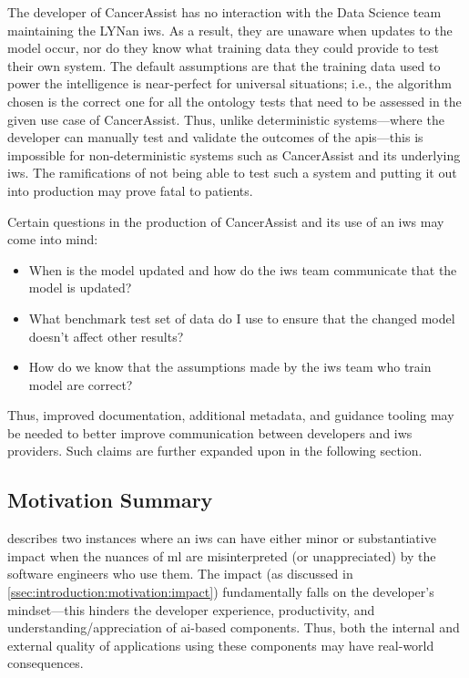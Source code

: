 The developer of CancerAssist has no interaction with the Data Science team maintaining the LYNan \gls{iws}. As a result, they are unaware when updates to the model occur, nor do they know what training data they could provide to test their own system. The default assumptions are that the training data used to power the intelligence is near-perfect for universal situations; i.e., the algorithm chosen is the correct one for all the ontology tests that need to be assessed in the given use case of CancerAssist. Thus, unlike deterministic systems---where the developer can manually test and validate the outcomes of the \glspl{api}---this is impossible for non-deterministic systems such as CancerAssist and its underlying \gls{iws}. The ramifications of not being able to test such a system and putting it out into production may prove fatal to patients.

Certain questions in the production of CancerAssist and its use of an \gls{iws} may come into mind:

\begin{itemize}
  \item When is the model updated and how do the \gls{iws} team communicate that the model is updated?
  \item What benchmark test set of data do I use to ensure that the changed model doesn't affect other results?
  \item How do we know that the assumptions made by the \gls{iws} team who train model are correct?
\end{itemize}

Thus, improved documentation, additional metadata, and guidance tooling may be needed to better improve communication between developers and \gls{iws} providers. Such claims are further expanded upon in the following section.

\subsection{Motivation Summary}

 describes two instances where an \gls{iws} can have either minor or substantiative impact when the nuances of \gls{ml} are misinterpreted (or unappreciated) by the software engineers who use them. The impact (as discussed in \cref{ssec:introduction:motivation:impact}) fundamentally falls on the developer's mindset---this hinders the developer experience, productivity, and understanding/appreciation of \gls{ai}-based components. Thus, both the internal and external quality of applications using these components may have real-world consequences.

